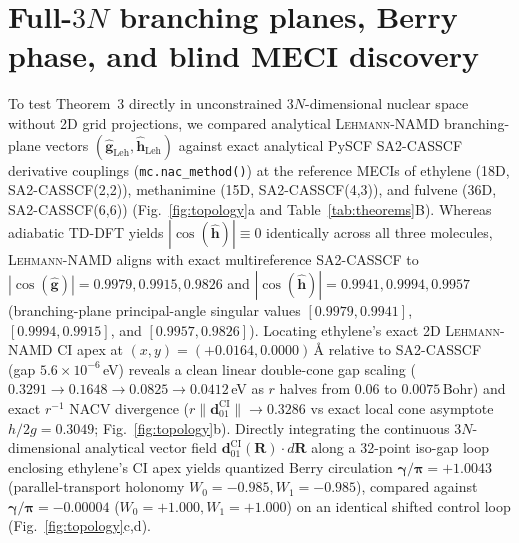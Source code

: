 \documentclass[10pt,twocolumn]{article}
\theoremstyle{natthm}
\newcommand{\leh}{\textsc{Lehmann-NAMD}}
\newcommand{\dCI}{\mathbf{d}_{01}^{\mathrm{CI}}}
\begin{document}
\section*{Full-$3N$ branching planes, Berry phase, and blind MECI discovery}
To test Theorem~3 directly in unconstrained $3N$-dimensional nuclear space without 2D grid projections, we compared analytical \leh{} branching-plane vectors $(\hat{\mathbf{g}}_{\mathrm{Leh}}, \hat{\mathbf{h}}_{\mathrm{Leh}})$ against exact analytical PySCF\cite{sun2020pyscf} SA2-CASSCF derivative couplings (\texttt{mc.nac\_method()}) at the reference MECIs of ethylene (18D, SA2-CASSCF(2,2)), methanimine (15D, SA2-CASSCF(4,3)), and fulvene (36D, SA2-CASSCF(6,6)) (Fig.~\ref{fig:topology}a and Table~\ref{tab:theorems}B).
Whereas adiabatic TD-DFT yields $|\cos(\hat{\mathbf{h}})|\equiv 0$ identically across all three molecules, \leh{} aligns with exact multireference SA2-CASSCF to $|\cos(\hat{\mathbf{g}})|=\mathbf{0.9979}, \mathbf{0.9915}, \mathbf{0.9826}$ and $|\cos(\hat{\mathbf{h}})|=\mathbf{0.9941}, \mathbf{0.9994}, \mathbf{0.9957}$ (branching-plane principal-angle singular values $[0.9979, 0.9941]$, $[0.9994, 0.9915]$, and $[0.9957, 0.9826]$).
Locating ethylene's exact 2D \leh{} CI apex at $(x,y)=(+0.0164, 0.0000)$\,\AA{} relative to SA2-CASSCF (gap $5.6\times 10^{-6}$\,eV) reveals a clean linear double-cone gap scaling ($0.3291\to 0.1648\to 0.0825\to 0.0412$\,eV as $r$ halves from $0.06$ to $0.0075$\,Bohr) and exact $r^{-1}$ NACV divergence ($r\|\dCI\|\to 0.3286$ vs exact local cone asymptote $h/2g=0.3049$; Fig.~\ref{fig:topology}b).
Directly integrating the continuous $3N$-dimensional analytical vector field $\dCI(\mathbf{R})\cdot d\mathbf{R}$ along a 32-point iso-gap loop enclosing ethylene's CI apex yields quantized Berry circulation $\mathbf{\gamma/\pi=+1.0043}$ (parallel-transport holonomy $W_0=-0.985, W_1=-0.985$), compared against $\mathbf{\gamma/\pi=-0.00004}$ ($W_0=+1.000, W_1=+1.000$) on an identical shifted control loop (Fig.~\ref{fig:topology}c,d).
\end{document}
